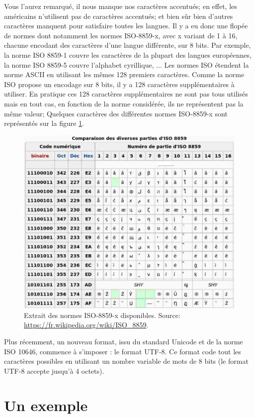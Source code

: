 

Vous l'aurez remarqué, il nous manque nos caractères accentués; en effet, les américains n'utilisent pas de caractères accentués; et bien sûr bien d'autres caractères manquent pour satisfaire toutes les langues. Il y a eu donc une flopée de normes dont notamment les normes ISO-8859-x, avec x variant de 1 à 16, chacune encodant des caractères d'une langue différente, sur 8 bits. Par exemple, la norme ISO 8859-1 couvre les caractères de la plupart des langues européennes, la norme ISO 8859-5 couvre l'alphabet cyrillique, ... Les normes ISO étendent la norme ASCII en utilisant les mêmes 128 premiers caractères. Comme la norme ISO propose un encodage sur 8 bits, il y a 128 caractères supplémentaires à utiliser. En pratique ces 128 caractères supplémentaires ne sont pas tous utilisés mais en tout cas, en fonction de la norme considérée, ils ne représentent pas la même valeur; Quelques caractères des différentes normes ISO-8859-x sont représentés sur la figure \ref{fig:iso8859}.

\begin{figure}[htbp]
\begin{center}
\includegraphics[width=0.5\columnwidth]{Figs/iso8859.png}
\end{center}
\caption{\label{fig:iso8859}Extrait des normes ISO-8859-x disponibles. Source: \protect\url{https://fr.wikipedia.org/wiki/ISO_8859}.}
\end{figure}

Plus récemment, un nouveau format, issu du standard Unicode et de la norme ISO 10646, commence à s'imposer : le format UTF-8. Ce format code tout les caractères possibles en utilisant un nombre variable de mots de 8 bits (le format UTF-8 accepte jusqu'à 4 octets). 


\section{Un exemple}


